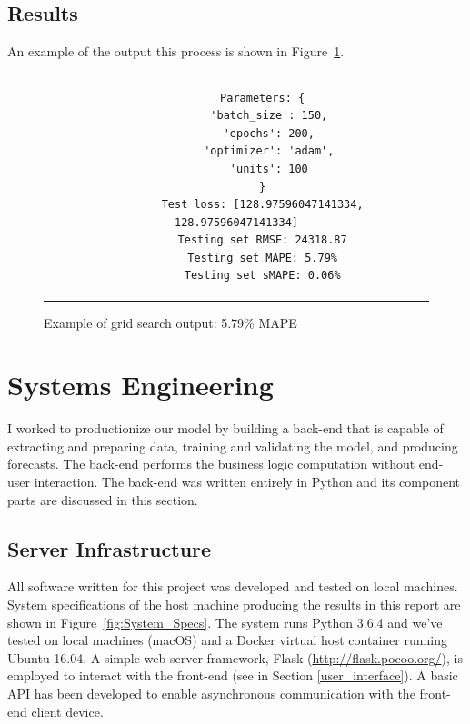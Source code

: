 \documentclass[11pt, oneside]{article}
\begin{document}
\subsection{Results}
An example of the output this process is shown in Figure~\ref{fig:Example_Output}.

\begin{figure}[h]
  \caption{Example of grid search output: 5.79\% MAPE}
  \label{fig:Example_Output}
  \begin{center}
    \begin{tabular}{c}
      \begin{lstlisting}
        Parameters: {
          'batch_size': 150,
          'epochs': 200,
          'optimizer': 'adam',
          'units': 100
        }
        Test loss: [128.97596047141334, 128.97596047141334]
        Testing set RMSE: 24318.87
        Testing set MAPE: 5.79%
        Testing set sMAPE: 0.06%
      \end{lstlisting}
    \end{tabular}
  \end{center}
\end{figure}

\section{Systems Engineering}
I worked to productionize our model by building a back-end that is capable of extracting and preparing data, training and validating the model, and producing forecasts. The back-end performs the business logic computation without end-user interaction. The back-end was written entirely in Python and its component parts are discussed in this section.

\subsection{Server Infrastructure}
All software written for this project was developed and tested on local machines. System specifications of the host machine producing the results in this report are shown in Figure~\ref{fig:System_Specs}. The system runs Python 3.6.4 and we've tested on local machines (macOS) and a Docker virtual host container running Ubuntu 16.04. A simple web server framework, Flask (\url{http://flask.pocoo.org/}), is employed to interact with the front-end (see in Section \ref{user_interface}). A basic API has been developed to enable asynchronous communication with the front-end client device.
\end{document}
